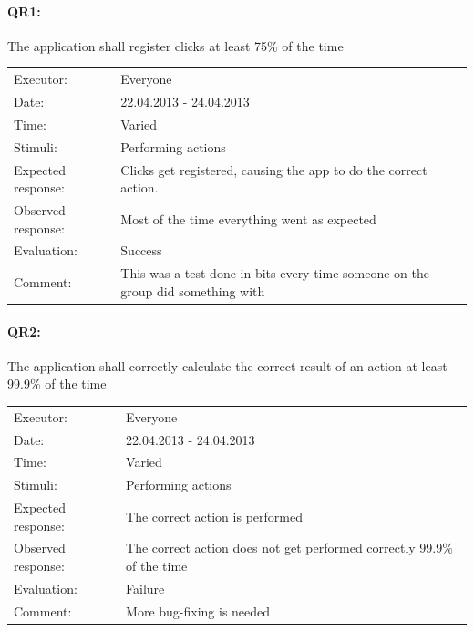\documentclass[12pt, a4paper]{article}
\begin{document}
\paragraph{QR1:} The application shall register clicks at least 75\% of the time
\\
\begin{tabular}{  p{}  p{} }
	Executor: & Everyone \\
	Date: & 22.04.2013 - 24.04.2013 \\
	Time: & Varied \\
	Stimuli: & Performing actions\\
    Expected response: & Clicks get registered, causing the app to do the correct action. \\
    Observed response: & Most of the time everything went as expected \\
    Evaluation: & Success \\
    Comment: & This was a test done in bits every time someone on the group did something with \\
\end{tabular}

\paragraph{QR2:} The application shall correctly calculate the correct result of an
action at least 99.9\% of the time \\
\begin{tabular}{  p{}  p{} }
    Executor: & Everyone \\
    Date: & 22.04.2013 - 24.04.2013 \\
    Time: & Varied \\
    Stimuli: & Performing actions \\
    Expected response: & The correct action is performed \\
    Observed response: & The correct action does not get performed correctly 99.9\% of the time \\
    Evaluation: & Failure \\
    Comment: & More bug-fixing is needed \\
\end{tabular}
\end{document}
